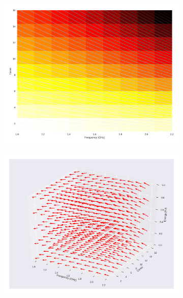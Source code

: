 \begin{figure}[H]

	\centering

	\begin{subfigure}[b]{0.45\textwidth}

		\includegraphics[width=\textwidth]{models/figures/analisys/pstatic0.png}

	\end{subfigure}


	\begin{subfigure}[b]{0.45\textwidth}

		\includegraphics[width=\textwidth]{models/figures/analisys/pstatic0_3d.png}

	\end{subfigure}

\end{figure}


